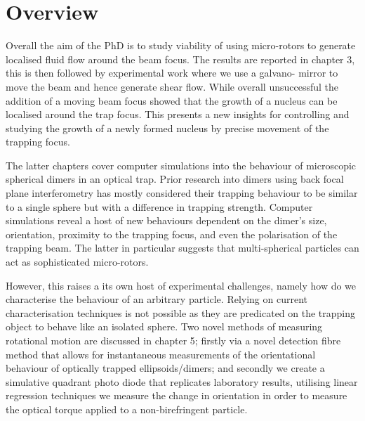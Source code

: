 \section{Overview}
Overall the aim of the PhD is to study viability of using 
micro-rotors to generate localised fluid flow around the 
beam focus. The results are reported in chapter 3, this is 
then followed by experimental work where we use a galvano-
mirror to move the beam and hence generate shear flow. While 
overall unsuccessful the addition of a moving beam focus 
showed that the growth of a nucleus can be localised around 
the trap focus. This presents a new insights for controlling 
and studying the growth of a newly formed nucleus by precise 
movement of the trapping focus.

The latter chapters cover computer simulations into the 
behaviour of microscopic spherical dimers in an optical
trap. Prior research into dimers using back focal plane
interferometry has mostly considered their trapping 
behaviour to be similar to a single sphere but with a 
difference in trapping strength. Computer simulations
reveal a host of new behaviours dependent on the dimer's
size, orientation, proximity to the trapping focus, and 
even the polarisation of the trapping beam. The latter in
particular suggests that multi-spherical particles can act
as sophisticated micro-rotors. 

However, this raises a its own host of experimental challenges,
namely how do we characterise the behaviour of an arbitrary
particle. Relying on current characterisation techniques is not
possible as they are predicated on the trapping object to behave
like an isolated sphere. Two novel methods of measuring rotational 
motion are discussed in chapter 5; firstly via a novel detection 
fibre method that allows for instantaneous measurements of the 
orientational behaviour of optically trapped ellipsoids/dimers; 
and secondly we create a simulative quadrant photo diode that 
replicates laboratory results, utilising linear regression 
techniques we measure the change in orientation in order to 
measure the optical torque applied to a non-birefringent particle. 

